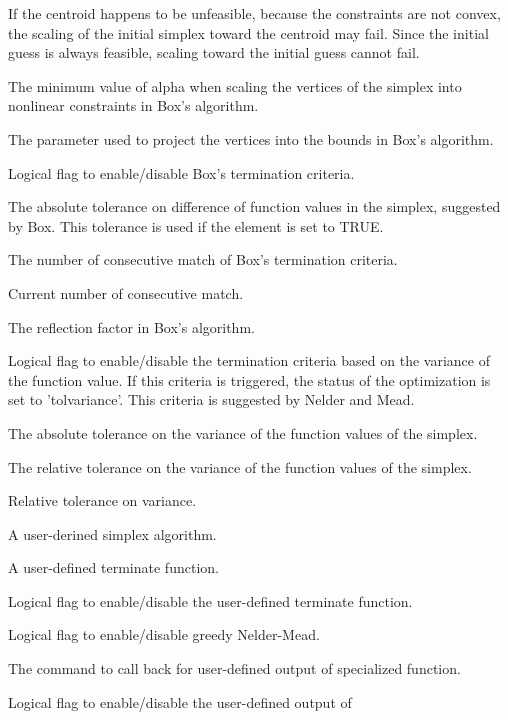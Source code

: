 \begin{Arguments}
\begin{ldescription}
If the centroid happens to be unfeasible, because the constraints are not
convex, the scaling of the initial simplex toward the centroid may fail.
Since the initial guess is always feasible, scaling toward the initial
guess cannot fail.
\item[\code{guinalphamin}] The minimum value of alpha when scaling the vertices of
the simplex into nonlinear constraints in Box's algorithm.
\item[\code{boxboundsalpha}] The parameter used to project the vertices into the
bounds in Box's algorithm.
\item[\code{boxtermination}] Logical flag to enable/disable Box's termination
criteria.
\item[\code{boxtolf}] The absolute tolerance on difference of function values in
the simplex, suggested by Box. This tolerance is used if the
 element is set to TRUE.
\item[\code{boxnbmatch}] The number of consecutive match of Box's termination
criteria.
\item[\code{boxkount}] Current number of consecutive match.
\item[\code{boxreflect}] The reflection factor in Box's algorithm.
\item[\code{tolvarianceflag}] Logical flag to enable/disable the termination
criteria based on the variance of the function value. If this criteria is
triggered, the status of the optimization is set to 'tolvariance'. This
criteria is suggested by Nelder and Mead.
\item[\code{tolabsolutevariance}] The absolute tolerance on the variance of the
function values of the simplex.
\item[\code{tolrelativevariance}] The relative tolerance on the variance of the
function values of the simplex.
\item[\code{variancesimplex0}] Relative tolerance on variance.
\item[\code{mymethod}] A user-derined simplex algorithm.
\item[\code{myterminate}] A user-defined terminate function.
\item[\code{myterminateflag}] Logical flag to enable/disable the user-defined
terminate function.
\item[\code{greedy}] Logical flag to enable/disable greedy Nelder-Mead.
\item[\code{output}] The command to call back for user-defined output of specialized 
function.
\item[\code{exitflag}] Logical flag to enable/disable the user-defined output of

\end{ldescription}
\end{Arguments}
